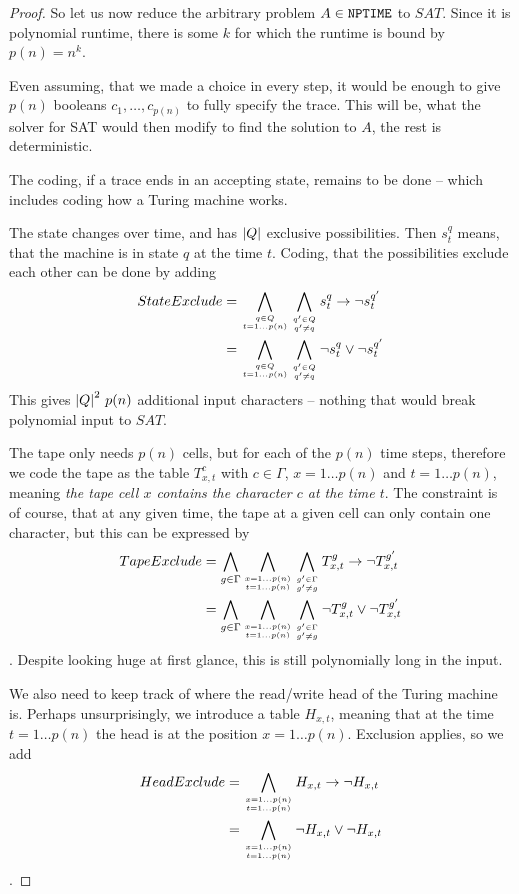 \begin{proof}
	So let us now reduce the arbitrary problem $A\in\mathtt{NPTIME}$ to $SAT$. Since it 
	is polynomial runtime, there is some $k$ for which the runtime is bound by 
	$p(n) = n^k$.

	Even assuming, that we made a choice in every step, it would be enough to
	give $p(n)$ booleans $c_1, \dots, c_{p(n)}$ to fully specify the trace. This
	will be, what the solver for SAT would then modify to find the solution to
	$A$, the rest is deterministic. 

	The coding, if a trace ends in an accepting state, remains to be done -- 
	which includes coding how a Turing machine works. 

	The state changes over time, and has $\left|Q\right|$ exclusive possibilities.
	Then $s^q_{t}$ means, that the machine is in state $q$ at the time $t$. 
	Coding, that the possibilities exclude each other can be done by adding 
	\begin{align}
		StateExclude &= \bigwedge_{q\in Q \atop t=1\ldots p(n)}{
		\bigwedge_{q'\in Q\atop q' \neq q}{s^q_{t} \rightarrow \lnot 
		s^{q'}_{t} }}\\
		&= \bigwedge_{q\in Q \atop t=1\ldots p(n)} 
		\bigwedge_{q'\in Q\atop q' \neq q} \lnot s^q_{t} \vee \lnot 
		s^{q'}_{t}
	\end{align}
	This gives $\left|Q\right|^2\,p(n)$ additional input characters -- nothing that would 
	break polynomial input to $SAT$.

	The tape only needs $p(n)$ cells, but for each of the $p(n)$ time steps, 
	therefore we code the tape as the table $T^c_{x, t}$ with $c\in\Gamma$, 
	$x = 1\ldots p(n)$ and $t=1\ldots p(n)$, meaning \emph{the tape cell $x$ 
	contains the character $c$ at the time $t$}. The constraint is of course, 
	that at any given time, the tape at a given cell can only contain one 
	character, but this can be expressed by
	\begin{align}
		TapeExclude &= \bigwedge_{g\in \Gamma}\bigwedge_{x=1\ldots p(n) \atop t=1\ldots p(n)}
		\bigwedge_{g'\in \Gamma\atop g' \neq g}{T^g_{x,t} \rightarrow \lnot 
		T^{g'}_{x,t} }\\
		&= \bigwedge_{g\in \Gamma}\bigwedge_{x=1\ldots p(n) \atop t=1\ldots p(n)} 
		\bigwedge_{g'\in \Gamma\atop g' \neq g} \lnot T^g_{x,t} \vee \lnot 
		T^{g'}_{x,t}
	\end{align}.
	Despite looking huge at first glance, this is still polynomially long in the input.

	We also need to keep track of where the read/write head of the Turing 
	machine is. Perhaps unsurprisingly, we introduce a table $H_{x,t}$, meaning 
	that at the time $t=1\ldots p(n)$ the head is at the position 
	$x=1\ldots p(n)$. Exclusion applies, so we add
	\begin{align}
		HeadExclude &= \bigwedge_{x=1\ldots p(n) \atop t=1\ldots p(n)}
		{H_{x,t} \rightarrow \lnot H_{x,t} }\\
		&= \bigwedge_{x=1\ldots p(n) \atop t=1\ldots p(n)} \lnot H_{x,t} \vee \lnot 
		H_{x,t}
	\end{align}.


\end{proof}
